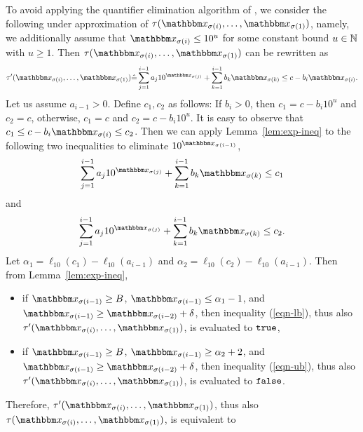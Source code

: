 To avoid applying the quantifier elimination algorithm of {\pa}, we consider the following under approximation of $\tau(\ivarx_{\sigma(i)}, \ldots, \ivarx_{\sigma(1)})$, namely, we additionally assume that $\ivarx_{\sigma(i)} \le 10^{u}$ for some constant bound $u \in \mathbb{N}$ with $u \ge 1$. Then $\tau(\ivarx_{\sigma(i)}, \ldots, \ivarx_{\sigma(1)})$ can be rewritten as 
\[\tau'(\ivarx_{\sigma(i)}, \ldots, \ivarx_{\sigma(1)}) \Def \sum_{j=1}^{i-1} a_j 10^{\ivarx_{\sigma(j)}} + \sum_{k=1}^{i-1}b_k \ivarx_{\sigma(k)} \le c - b_i  \ivarx_{\sigma(i)}.\]
Let us assume $a_{i-1} > 0$.
Define $c_1, c_2$ as follows: If $b_i > 0$, then $c_1 = c- b_i 10^u$ and $c_2 = c$, otherwise, $c_1 = c$ and $c_2 = c - b_i 10^u$.
It is easy to observe that $c_1 \le c - b_i \ivarx_{\sigma(i)} \le c_2$.
Then we can apply Lemma~\ref{lem:exp-ineq} to the following two inequalities to eliminate $10^{\ivarx_{\sigma(i-1)}}$,
\begin{equation}\label{eqn-lb}
\sum_{j=1}^{i-1} a_j 10^{\ivarx_{\sigma(j)}} + \sum_{k=1}^{i-1}b_k \ivarx_{\sigma(k)} \le c_1
\end{equation}
and
\begin{equation}\label{eqn-ub}
\sum_{j=1}^{i-1} a_j 10^{\ivarx_{\sigma(j)}} + \sum_{k=1}^{i-1}b_k \ivarx_{\sigma(k)} \le c_2.
\end{equation}
Let $\alpha_1 = \ell_{10}(c_1) -  \ell_{10}(a_{i-1})$ and $\alpha_2 = \ell_{10}(c_2) -  \ell_{10}(a_{i-1})$. Then from Lemma~\ref{lem:exp-ineq}, 
\begin{itemize}
\item if $\ivarx_{\sigma(i-1)} \ge B$, $\ivarx_{\sigma(i-1)} \le \alpha_1 - 1$, and $\ivarx_{\sigma(i-1)} \ge \ivarx_{\sigma(i-2)} + \delta$, then inequality (\ref{eqn-lb}), thus also $\tau'(\ivarx_{\sigma(i)}, \ldots, \ivarx_{\sigma(1)})$, is evaluated to $\mathtt{true}$,
\item if $\ivarx_{\sigma(i-1)} \ge B$, $\ivarx_{\sigma(i-1)} \ge \alpha_2 + 2$, and $\ivarx_{\sigma(i-1)} \ge \ivarx_{\sigma(i-2)} + \delta$, then inequality (\ref{eqn-ub}), thus also $\tau'(\ivarx_{\sigma(i)}, \ldots, \ivarx_{\sigma(1)})$, is evaluated to $\mathtt{false}$.
\end{itemize}
Therefore, $\tau'(\ivarx_{\sigma(i)}, \ldots, \ivarx_{\sigma(1)})$, thus also $\tau(\ivarx_{\sigma(i)}, \ldots, \ivarx_{\sigma(1)})$, is equivalent to 
